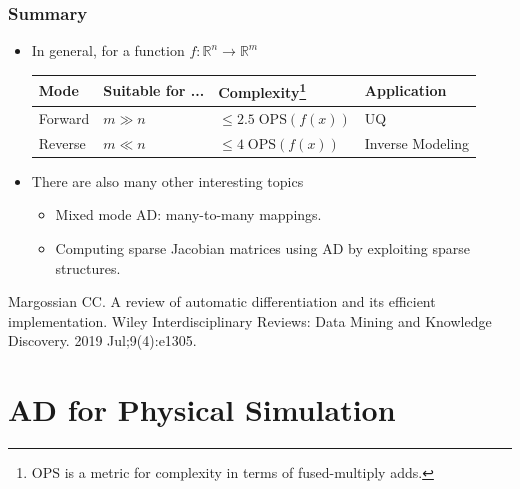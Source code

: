 \documentclass{beamer}
\newcommand{\RR}[0]{\mathbb{R}}
\begin{document}
\begin{frame}
	\frametitle{Summary}
	
	\begin{itemize}
		\item In general, for a function $f:\RR^n \rightarrow \RR^m$
\begin{table}[]
\centering
\begin{tabular}{@{}llll@{}}
\toprule
Mode & Suitable for ... & Complexity\footnote{$\mathrm{OPS}$ is a metric for complexity in terms of fused-multiply adds.} & Application \\ \midrule
Forward & $m\gg n$ & $\leq 2.5\;\mathrm{OPS}(f(x))$ & UQ \\
Reverse & $m\ll n$ & $\leq 4\;\mathrm{OPS}(f(x))$ & Inverse Modeling \\ \bottomrule
\end{tabular}
\end{table}
	
		
		\item There are also many other interesting topics
		\begin{itemize}
		\item Mixed mode AD: many-to-many mappings.
		\item Computing sparse Jacobian matrices using AD by exploiting sparse structures. 
		\end{itemize}
	\end{itemize}
	{\scriptsize Margossian CC. A review of automatic differentiation and its efficient implementation. Wiley Interdisciplinary Reviews: Data Mining and Knowledge Discovery. 2019 Jul;9(4):e1305.} 
\end{frame}


\section{AD for Physical Simulation}
\end{document}
